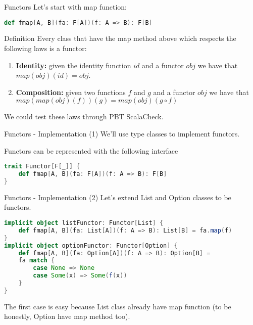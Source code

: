\begin{frame}[fragile]{Functors}
	Let's start with map function:
\begin{lstlisting}[language=scala]
def fmap[A, B](fa: F[A])(f: A => B): F[B]
\end{lstlisting}
	\begin{block}{Definition}
		Every class that have the map method above which respects the following laws is a functor:
		\begin{enumerate}[<+->]
			\item \textbf{Identity:} given the identity function $id$ and a functor $obj$ we have that $map(obj)(id) = obj$.
			\item \textbf{Composition:} given two functions $f$ and $g$ and a functor $obj$ we have that $map(map(obj)(f))(g) = map(obj)(g \circ f)$
		\end{enumerate}
	\end{block}
	\pause[2]
	We could test these laws through PBT ScalaCheck.
\end{frame}

\begin{frame}[fragile]{Functors - Implementation (1)}	
	We'll use type classes to implement functors.
	
	Functors can be represented with the following interface
\begin{lstlisting}[language=scala]
trait Functor[F[_]] {
	def fmap[A, B](fa: F[A])(f: A => B): F[B]
}
\end{lstlisting}
\end{frame}

\begin{frame}[fragile]{Functors - Implementation (2)}			
Let's extend List and Option classes to be functors.
\begin{lstlisting}[language=scala]
implicit object listFunctor: Functor[List] {
	def fmap[A, B](fa: List[A])(f: A => B): List[B] = fa.map(f)
}
implicit object optionFunctor: Functor[Option] {
	def fmap[A, B](fa: Option[A])(f: A => B): Option[B] = 
	fa match {
		case None => None
		case Some(x) => Some(f(x))	
	}
}			
\end{lstlisting}		
	The first case is easy because List class already have map function
	(to be honestly, Option have map method too).
\end{frame}
	
